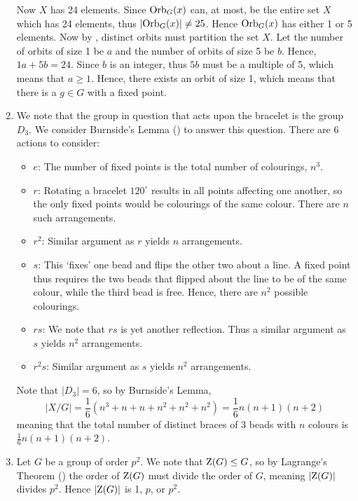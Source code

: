 \begin{enumerate}
    Now $X$ has 24 elements. Since $\mathrm{Orb}_{G}(x)$ can, at most, be the entire set $X$ which has 24 elements, thus $|\mathrm{Orb}_{G}(x)| \neq 25$. Hence $\mathrm{Orb}_{G}(x)$ has either 1 or 5 elements. Now by , distinct orbits must partition the set $X$. Let the number of orbits of size 1 be $a$ and the number of orbits of size 5 be $b$. Hence, $1a + 5b = 24$. Since $b$ is an integer, thus $5b$ must be a multiple of 5, which means that $a \geq 1$. Hence, there exists an orbit of size 1, which means that there is a $g \in G$ with a fixed point.

    \item We note that the group in question that acts upon the bracelet is the group $D_3$. We consider Burnside's Lemma () to answer this question. There are 6 actions to consider:
    \begin{itemize}
        \item $\boxed{e}$: The number of fixed points is the total number of colourings, $n^3$.
        \item $\boxed{r}$: Rotating a bracelet $120^\circ$ results in all points affecting one another, so the only fixed points would be colourings of the same colour. There are $n$ such arrangements.
        \item $\boxed{r^2}$: Similar argument as $r$ yields $n$ arrangements.
        \item $\boxed{s}$: This `fixes' one bead and flips the other two about a line. A fixed point thus requires the two beads that flipped about the line to be of the same colour, while the third bead is free. Hence, there are $n^2$ possible colourings.
        \item $\boxed{rs}$: We note that $rs$ is yet another reflection. Thus a similar argument as $s$ yields $n^2$ arrangements.
        \item $\boxed{r^2s}$: Similar argument as $s$ yields $n^2$ arrangements.
    \end{itemize}
    Note that $|D_3| = 6$, so by Burnside's Lemma,
    \[
        |X/G| = \frac16\left(n^3 + n + n + n^2 + n^2 + n^2\right) = \frac16 n(n+1)(n+2)
    \]
    meaning that the total number of distinct braces of 3 beads with $n$ colours is $\frac16 n(n+1)(n+2)$.

    \item Let $G$ be a group of order $p^2$. We note that $\mathrm{Z}(G) \leq G$, so by Lagrange's Theorem () the order of $\mathrm{Z}(G)$ must divide the order of $G$, meaning $|\mathrm{Z}(G)|$ divides $p^2$. Hence $|\mathrm{Z}(G)|$ is 1, $p$, or $p^2$.


\end{enumerate}
